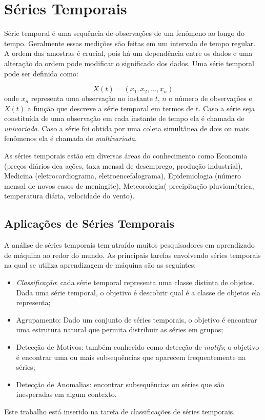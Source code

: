 \section{Séries Temporais}

Série temporal é uma sequência de observações de um fenômeno ao longo do tempo. Geralmente essas medições são feitas em um intervalo de tempo regular. A ordem das amostras é crucial, pois há um dependência entre os dados e uma alteração da ordem pode modificar o significado dos dados. Uma série temporal pode ser definida como:

\begin{equation} \label{eq_TS}
X(t) = (x_1,x_2,...,x_n)
\end{equation}
onde $x_n$ representa uma observação no instante $t$, $n$ o número de observações e $X(t)$ a função que descreve a série temporal em termos de t. Caso a série seja constituída de uma observação em cada instante de tempo ela é chamada de \textit{univariada}. Caso a série foi obtida por uma coleta simultânea de dois ou mais fenômenos ela é chamada de \textit{multivariada}.

As séries temporais estão em diversas áreas do conhecimento como Economia (preços diários dea ações, taxa mensal de desemprego, produção industrial), Medicina (eletrocardiograma, eletroencefalograma), Epidemiologia (número mensal de novos casos de meningite), Meteorologia( precipitação pluviométrica, temperatura diária, velocidade do vento).

\subsection{Aplicações de Séries Temporais}
A análise de séries temporais tem atraído muitos pesquisadores em aprendizado de máquina ao redor do mundo. As principais tarefas envolvendo séries temporais na qual se utiliza aprendizagem de máquina são as seguintes:

\begin{itemize}
	\item \textit{Classificação}: cada série temporal representa uma classe distinta de objetos. Dada uma série temporal, o objetivo é descobrir qual é a classe de objetos ela representa; 
	\item Agrupamento: Dado um conjunto de séries temporais, o objetivo é encontrar uma estrutura natural que permita distribuir as séries em grupos; 
	\item Detecção de Motivos: também conhecido como detecção de \textit{motifs}; o objetivo é encontrar uma ou mais subsequências que aparecem frequentemente na séries;
	\item Detecção de Anomalias: encontrar subsequências ou séries que são inesperadas em algum contexto.
\end{itemize}
Este trabalho está inserido na tarefa de classificações de séries temporais.
